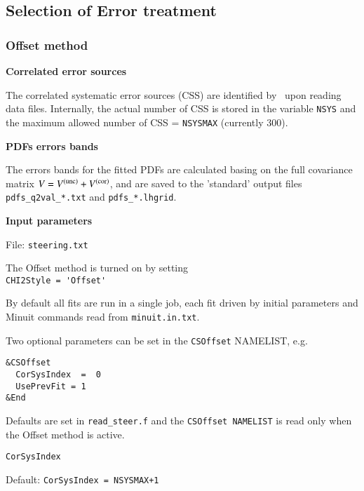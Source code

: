 \subsection{Selection of Error treatment}

\subsubsection {Offset method}


{\bf {Correlated error sources}}

The correlated systematic error sources (CSS) are identified by \fitter\ upon reading data files.
Internally, the actual number of CSS 
is stored in the variable \verb'NSYS'
and the maximum allowed number of CSS = \verb'NSYSMAX' (currently 300).
\vspace{0.4cm}

{\bf {PDFs errors bands}}

The errors bands for the fitted PDFs are calculated 
basing on the full covariance matrix $V = V^{\mathrm{(unc)}} + V^{\mathrm{(cor)}}$,
and are saved to the 'standard' output files
\verb'pdfs_q2val_*.txt' and \verb'pdfs_*.lhgrid'.
\vspace{0.4cm}

{\bf {Input parameters}}

File: \verb'steering.txt'

The Offset method is turned on by setting\\
\verb:CHI2Style = 'Offset':

By default all fits are run in a single job, each fit driven by initial parameters and Minuit commands
read from \verb'minuit.in.txt'.

Two optional parameters can be set in the \verb'CSOffset' NAMELIST, e.g.
\vspace*{-2.5ex}
\begin{verbatim}
&CSOffset
  CorSysIndex  =  0
  UsePrevFit = 1
&End
\end{verbatim}
\vspace*{-1ex}
Defaults are set in \verb'read_steer.f'
and the \verb'CSOffset NAMELIST' is read only when the Offset method is active.
\vspace{0.4cm}

{\tt CorSysIndex}

Default: \verb'CorSysIndex = NSYSMAX+1'

